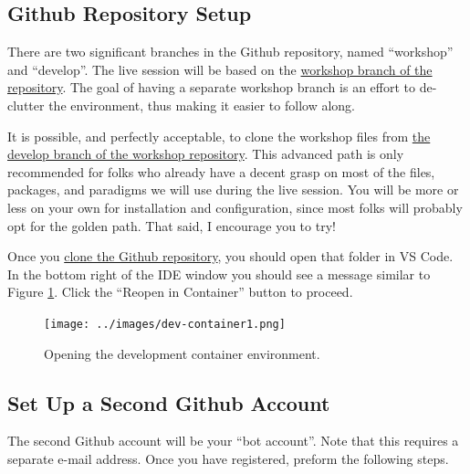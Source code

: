 \subsection{\label{sec:repo}Github Repository Setup}

\justifying
There are two significant branches in the Github repository, named ``workshop'' and ``develop''. The live session will be based on the \href{https://github.com/devsecfranklin/workshop-codemash-2023/tree/workshop}{workshop branch of the repository}. The goal of having a
separate workshop branch is an effort to de-clutter the environment, thus making it easier to follow along.
\vspace{2mm}

\justifying
It is possible, and perfectly acceptable, to clone the workshop files from \href{https://github.com/devsecfranklin/workshop-codemash-2023/tree/develop}{the develop branch of the workshop repository}. This
advanced path is only recommended for folks who already have a  decent grasp on most of the files, packages, and paradigms we will
use during the live session. You will be more or less on your own for installation and configuration, since most folks will probably
opt for the golden path. That said, I encourage you to try!
\vspace{2mm}

\justifying
Once you \href{https://github.com/devsecfranklin/workshop-codemash-2023/tree/workshop}{clone the Github repository}, you should open that folder in VS Code. In the bottom right of the IDE window you should see a message similar to Figure \ref{dev-container}. Click the ``Reopen in Container'' button to proceed.

\begin{figure}[ht]
	\texttt{[image: ../images/dev-container1.png]}
	\caption{Opening the development container environment.}
	\label{dev-container}
\end{figure}
\vspace{2mm}

\subsection{\label{sec:acct}Set Up a Second Github Account}

\justifying
The second Github account will be your ``bot account''. Note that this requires a separate e-mail address. Once you have registered,
preform the following steps.
\vspace{2mm}

